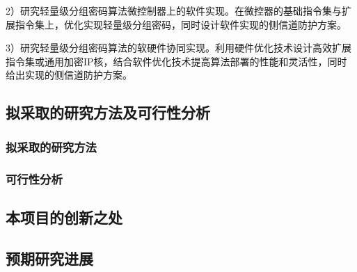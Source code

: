 \documentclass{ctexart}
\begin{document}
2）研究轻量级分组密码算法微控制器上的软件实现。在微控器的基础指令集与扩展指令集上，优化实现轻量级分组密码，同时设计软件实现的侧信道防护方案。

3）研究轻量级分组密码算法的软硬件协同实现。利用硬件优化技术设计高效扩展指令集或通用加密IP核，结合软件优化技术提高算法部署的性能和灵活性，同时给出实现的侧信道防护方案。

\subsection{拟采取的研究方法及可行性分析}
\subsubsection{拟采取的研究方法}
\subsubsection{可行性分析}

\subsection{本项目的创新之处}
\subsection{预期研究进展}
\end{document}
